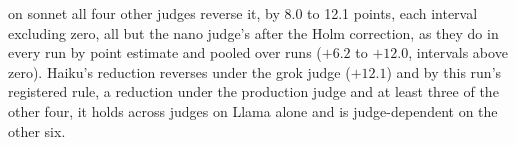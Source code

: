 on sonnet all four other judges reverse it, by 8.0 to 12.1 points, each
interval excluding zero, all but the nano judge's after the Holm
correction, as they do in every run by point estimate and pooled over runs
($+6.2$ to $+12.0$, intervals above zero).
Haiku's reduction
reverses under the grok judge ($+12.1$) and by this run's
registered rule, a reduction under the production judge and at least three
of the other four, it holds across judges on Llama alone and is
judge-dependent on the other six.
